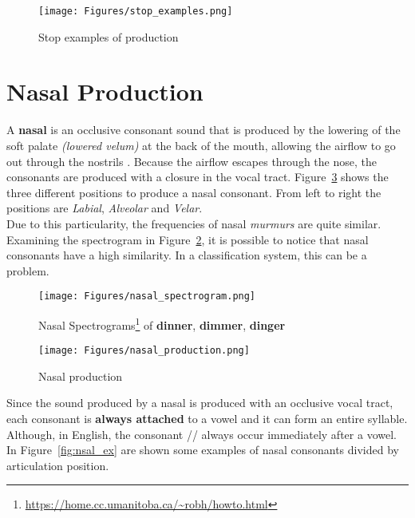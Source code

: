 \begin{figure}[!ht]
    \centering
    \texttt{[image: Figures/stop\_examples.png]}
    \caption{Stop examples of production \cite{mit_phonetics}}
    \label{fig:stop_ex}
\end{figure}


\section{Nasal Production}
\label{sec:Nasal Production}
A \textbf{nasal} is an occlusive consonant sound that is produced by the lowering of the soft palate \textit{(lowered velum)} at the back of the mouth, allowing the airflow to go out through the nostrils \cite{nasal_speech_sound}. Because the airflow escapes through the nose, the consonants are produced with a closure in the vocal tract. Figure~\ref{fig:nasal_prod} shows the three different positions to produce a nasal consonant. From left to right the positions are \textit{Labial}, \textit{Alveolar} and \textit{Velar}. \\
\noindent Due to this particularity, the frequencies of nasal \textit{murmurs} are quite similar. Examining the spectrogram in Figure~\ref{fig:nasal_spectrogram}, it is possible to notice that nasal consonants have a high similarity. In a classification system, this can be a problem.

\begin{figure}[!ht]
    \centering
    \texttt{[image: Figures/nasal\_spectrogram.png]}
    \caption{Nasal Spectrograms\footnote{\url{https://home.cc.umanitoba.ca/~robh/howto.html}} of \textbf{dinner}, \textbf{dimmer}, \textbf{dinger}}
    \label{fig:nasal_spectrogram}
\end{figure}

\begin{figure}[!ht]
    \centering
    \texttt{[image: Figures/nasal\_production.png]}
    \caption{Nasal production \cite{mit_phonetics}}
    \label{fig:nasal_prod}
\end{figure}

\noindent Since the sound produced by a nasal is produced with an occlusive vocal tract, each consonant is \textbf{always attached} to a vowel and it can form an entire syllable. Although, in English, the consonant /\textbf{}/ always occur immediately after a vowel. In Figure~\ref{fig:nsal_ex} are shown some examples of nasal consonants divided by articulation position.

